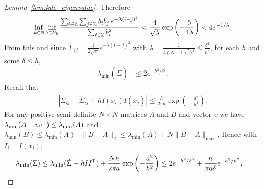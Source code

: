 \begin{proof}[Lemma~\ref{lem:kde_eigenvalue}]
  Therefore
  \begin{align*}
    \inf_{k \in \mathbb{N}}
    \inf_{b \in \mathcal{B}_k}
    \frac{\sum_{i \in \mathbb{Z}} \sum_{j \in \mathbb{Z}} b_i b_j \, e^{-\lambda(i-j)^2}}
    {\sum_{i \in \mathbb{Z}} b_i^2}
    < \frac{4}{\sqrt \lambda}
    \exp \left( - \frac{5}{4 \lambda} \right)
    < 4 e^{-1/\lambda}.
  \end{align*}
  From this and since
  $\tilde\Sigma_{i j} = \frac{1}{2 \sqrt \pi} e^{-\lambda(i-j)^2}$
  with $\lambda = \frac{1}{4(N-1)^2 h^2} \leq \frac{\delta^2}{h^2}$,
  for each $h$ and some $\delta \leq h$,
  \begin{align*}
    \lambda_{\min}(\tilde\Sigma)
    &\leq
    2 e^{-h^2/\delta^2}.
  \end{align*}
  Recall that
  \begin{align*}
    \left|
    \Sigma_{i j}
    - \tilde\Sigma_{i j}
    + h I(x_i) I(x_j)
    \right|
    \leq
    \frac{h}{2 \pi a}
    \exp \left(- \frac{a^2}{h^2}\right).
  \end{align*}
  For any positive semi-definite $N \times N$ matrices $A$ and $B$
  and vector $v$ we have $\lambda_{\min}(A - v v^{\mathsf{T}}) \leq \lambda_{\min}(A)$
  and $\lambda_{\min}(B) \leq \lambda_{\min}(A) + \|B-A\|_2
  \leq \lambda_{\min}(A) + N \|B-A\|_{\max}$.
  Hence with $I_i = I(x_i)$,
  \begin{align*}
    \lambda_{\min}(\Sigma)
    &\leq
    \lambda_{\min}(\tilde\Sigma - h I I^{\mathsf{T}})
    + \frac{N h}{2 \pi a}
    \exp \left(- \frac{a^2}{h^2}\right)
    \leq
    2 e^{-h^2/\delta^2}
    + \frac{h}{\pi a \delta}
    e^{-a^2 / h^2}.
  \end{align*}
\end{proof}

